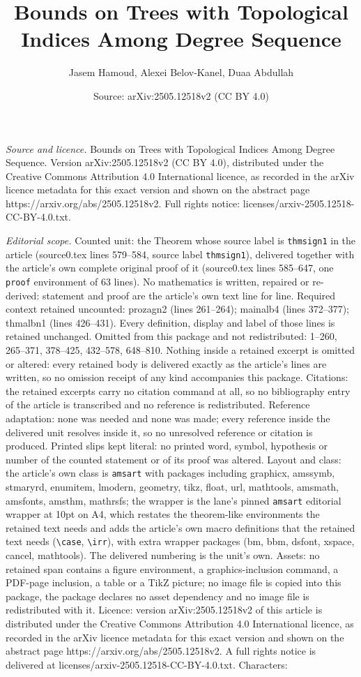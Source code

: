 \documentclass[10pt,a4paper]{amsart}
\title[Bounds on Trees with Topological Indices Among Degree Sequen]{Bounds on Trees with Topological Indices Among Degree Sequence}
\author{Jasem Hamoud, Alexei Belov-Kanel, Duaa Abdullah}
\date{Source: arXiv:2505.12518v2 (CC BY 4.0)}
\begin{document}
\maketitle

\noindent\emph{Source and licence.} Bounds on Trees with Topological Indices Among Degree Sequence. Version arXiv:2505.12518v2 (CC BY 4.0), distributed under the Creative Commons Attribution 4.0 International licence, as recorded in the arXiv licence metadata for this exact version and shown on the abstract page https://arxiv.org/abs/2505.12518v2. Full rights notice: licenses/arxiv-2505.12518-CC-BY-4.0.txt.\par\smallskip

\noindent\textit{Editorial scope.} Counted unit: the Theorem whose source label is \texttt{thmsign1} in the article (source0.tex lines 579--584, source label \texttt{thmsign1}), delivered together with the article's own complete original proof of it (source0.tex lines 585--647, one \texttt{proof} environment of 63 lines). No mathematics is written, repaired or re-derived: statement and proof are the article's own text line for line. Required context retained uncounted: prozagn2 (lines 261--264); mainalb4 (lines 372--377); thmalbn1 (lines 426--431). Every definition, display and label of those lines is retained unchanged. Omitted from this package and not redistributed: 1--260, 265--371, 378--425, 432--578, 648--810. Nothing inside a retained excerpt is omitted or altered: every retained body is delivered exactly as the article's lines are written, so no omission receipt of any kind accompanies this package. Citations: the retained excerpts carry no citation command at all, so no bibliography entry of the article is transcribed and no reference is redistributed. Reference adaptation: none was needed and none was made; every reference inside the delivered unit resolves inside it, so no unresolved reference or citation is produced. Printed slips kept literal: no printed word, symbol, hypothesis or number of the counted statement or of its proof was altered. Layout and class: the article's own class is \texttt{amsart} with packages including graphicx, amssymb, stmaryrd, enumitem, lmodern, geometry, tikz, float, url, mathtools, amsmath, amsfonts, amsthm, mathrsfs; the wrapper is the lane's pinned \texttt{amsart} editorial wrapper at 10pt on A4, which restates the theorem-like environments the retained text needs and adds the article's own macro definitions that the retained text needs (\texttt{\textbackslash case}, \texttt{\textbackslash irr}), with extra wrapper packages (bm, bbm, dsfont, xspace, cancel, mathtools). The delivered numbering is the unit's own. Assets: no retained span contains a figure environment, a graphics-inclusion command, a PDF-page inclusion, a table or a TikZ picture; no image file is copied into this package, the package declares no asset dependency and no image file is redistributed with it. Licence: version arXiv:2505.12518v2 of this article is distributed under the Creative Commons Attribution 4.0 International licence, as recorded in the arXiv licence metadata for this exact version and shown on the abstract page https://arxiv.org/abs/2505.12518v2. A full rights notice is delivered at licenses/arxiv-2505.12518-CC-BY-4.0.txt. Characters: 
\end{document}
